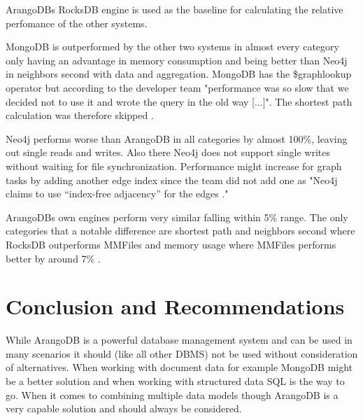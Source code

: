 ArangoDBs RocksDB engine is used as the baseline for calculating the relative perfomance of the other systems.

MongoDB is outperformed by the other two systems in almost every category only having an advantage in memory consumption and being better than Neo4j in neighbors second with data and aggregation. MongoDB has the \$graphlookup operator but according to the developer team "performance was so slow that we decided not to use it and wrote the query in the old way [...]". The shortest path calculation was therefore skipped \parencite{DBBenchmark}.

Neo4j performs worse than ArangoDB in all categories by almost 100\%, leaving out single reads and writes. Also there Neo4j does not support single writes without waiting for file synchronization. Performance might increase for graph tasks by adding another edge index since the team did not add one as "Neo4j claims to use “index-free adjacency” for the edges \parencite{DBBenchmark}."

ArangoDBs own engines perform very similar falling within 5\% range. The only categories that a notable difference are shortest path and neighbors second where RocksDB outperforms MMFiles and memory usage where MMFiles performs better by around 7\% \parencite{DBBenchmark}.

\section{Conclusion and Recommendations}
While ArangoDB is a powerful database management system and can be used in many scenarios it should (like all other DBMS) not be used without consideration of alternatives. When working with document data for example MongoDB might be a better solution and when working with structured data SQL is the way to go. When it comes to combining multiple data models though ArangoDB is a very capable solution and should always be considered.

